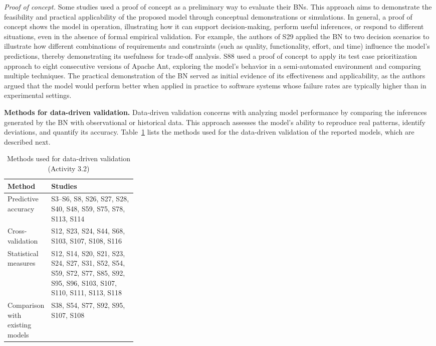 \textit{Proof of concept.} Some studies used a proof of concept as a preliminary way to evaluate their BNs. This approach aims to demonstrate the feasibility and practical applicability of the proposed model through conceptual demonstrations or simulations. In general, a proof of concept shows the model in operation, illustrating how it can support decision-making, perform useful inferences, or respond to different situations, even in the absence of formal empirical validation. For example, the authors of S29 applied the BN to two decision scenarios to illustrate how different combinations of requirements and constraints (such as quality, functionality, effort, and time) influence the model's predictions, thereby demonstrating its usefulness for trade-off analysis. S88 used a proof of concept to apply its test case prioritization approach to eight consecutive versions of Apache Ant, exploring the model's behavior in a semi-automated environment and comparing multiple techniques. The practical demonstration of the BN served as initial evidence of its effectiveness and applicability, as the authors argued that the model would perform better when applied in practice to software systems whose failure rates are typically higher than in experimental settings.

\vspace*{0.5\baselineskip}

\textbf{Methods for data-driven validation.} Data-driven validation concerns with analyzing model performance by comparing the inferences generated by the BN with observational or historical data. This approach assesses the model's ability to reproduce real patterns, identify deviations, and quantify its accuracy. Table~\ref{tab:metodos_validacao_dados} lists the methods used for the data-driven validation of the reported models, which are described next.

\begin{table}[t]
\caption{Methods used for data-driven validation (Activity 3.2)}
\label{tab:metodos_validacao_dados}
\centering
\small
\setlength{\tabcolsep}{6pt}
\renewcommand{\arraystretch}{1.2}

\begin{tabularx}{\linewidth}{>{\raggedright\arraybackslash}p{0.30\linewidth}
                              >{\raggedright\arraybackslash}X}
\toprule
\textbf{Method} & \textbf{Studies} \\
\midrule
Predictive accuracy
& S3--S6, S8, S26, S27, S28, S40, S48, S59, S75, S78, S113, S114 \\
Cross-validation
& S12, S23, S24, S44, S68, S103, S107, S108, S116 \\
Statistical measures
& S12, S14, S20, S21, S23, S24, S27, S31, S52, S54, S59, S72, S77, S85, S92, S95, S96, S103, S107, S110, S111, S113, S118 \\
Comparison with existing models
& S38, S54, S77, S92, S95, S107, S108 \\
\bottomrule
\end{tabularx}
\end{table}

